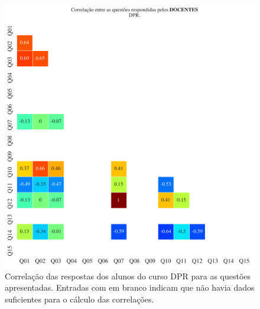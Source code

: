\documentclass[a4paper,10pt]{article}
\begin{document}
\begin{figure}[h]
\centering
\includegraphics[width=0.999\linewidth]{matriz_corr__DPR_docentes.png}
\caption{\label{fig:corr_docentes}Correlação das respostas dos alunos do curso DPR para as questões apresentadas. Entradas com em branco indicam que não havia dados suficientes para o cálculo das correlações.}
\end{figure}
\end{document}
